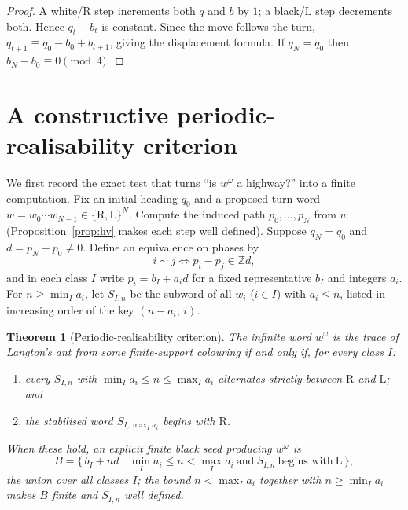 \documentclass[11pt,reqno]{amsart}
\theoremstyle{plain}
\newtheorem{theorem}{Theorem}[section]
\theoremstyle{definition}
\newcommand{\Z}{\mathbb{Z}}
\newcommand{\drift}{d}
\newcommand{\turnR}{\mathrm{R}}
\newcommand{\turnL}{\mathrm{L}}
\begin{document}
\begin{proof}
A white/$\turnR$ step increments both $q$ and $b$ by $1$; a black/$\turnL$ step
decrements both. Hence $q_t-b_t$ is constant. Since the move follows the turn,
$q_{t+1}\equiv q_0-b_0+b_{t+1}$, giving the displacement formula. If $q_N=q_0$ then
$b_N-b_0\equiv 0\pmod4$.
\end{proof}

\section{A constructive periodic-realisability criterion}\label{sec:criterion}

We first record the exact test that turns ``is $w^\omega$ a highway?'' into a finite
computation. Fix an initial heading $q_0$ and a proposed turn word
$w=w_0\cdots w_{N-1}\in\{\turnR,\turnL\}^N$. Compute the induced path
$p_0,\dots,p_N$ from $w$ (Proposition~\ref{prop:hv} makes each step well defined).
Suppose $q_N=q_0$ and $\drift=p_N-p_0\neq0$. Define an equivalence on phases by
\[
i\sim j\iff p_i-p_j\in\Z\drift,
\]
and in each class $I$ write $p_i=b_I+a_i\drift$ for a fixed representative $b_I$ and
integers $a_i$. For $n\ge\min_I a_i$, let $S_{I,n}$ be the subword of all $w_i$
($i\in I$) with $a_i\le n$, listed in increasing order of the key $(n-a_i,\,i)$.

\begin{theorem}[Periodic-realisability criterion]\label{thm:criterion}
The infinite word $w^\omega$ is the trace of Langton's ant from some finite-support
colouring if and only if, for every class $I$:
\begin{enumerate}[label=\textup{(\roman*)}]
\item every $S_{I,n}$ with $\min_I a_i\le n\le\max_I a_i$ alternates strictly between
$\turnR$ and $\turnL$; and
\item the stabilised word $S_{I,\max_I a_i}$ begins with $\turnR$.
\end{enumerate}
When these hold, an explicit finite black seed producing $w^\omega$ is
\begin{equation}\label{eq:seed}
B=\bigl\{\,b_I+n\drift\ :\ \textstyle\min_I a_i\le n<\max_I a_i\ \text{and}\ S_{I,n}\ \text{begins with}\ \turnL\,\bigr\},
\end{equation}
the union over all classes $I$; the bound $n<\max_I a_i$ together with
$n\ge\min_I a_i$ makes $B$ finite and $S_{I,n}$ well defined.
\end{theorem}
\end{document}
